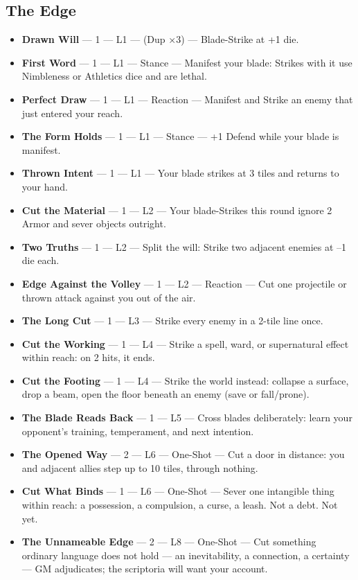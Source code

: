 \subsection{The Edge}
\begin{itemize}
    \item \textbf{Drawn Will} --- 1 --- L1 --- (Dup ×3) --- Blade-Strike at +1 die.
    \item \textbf{First Word} --- 1 --- L1 --- Stance --- Manifest your blade: Strikes with it use Nimbleness or Athletics dice and are lethal.
    \item \textbf{Perfect Draw} --- 1 --- L1 --- Reaction --- Manifest and Strike an enemy that just entered your reach.
    \item \textbf{The Form Holds} --- 1 --- L1 --- Stance --- +1 Defend while your blade is manifest.
    \item \textbf{Thrown Intent} --- 1 --- L1 --- Your blade strikes at 3 tiles and returns to your hand.
    \item \textbf{Cut the Material} --- 1 --- L2 --- Your blade-Strikes this round ignore 2 Armor and sever objects outright.
    \item \textbf{Two Truths} --- 1 --- L2 --- Split the will: Strike two adjacent enemies at --1 die each.
    \item \textbf{Edge Against the Volley} --- 1 --- L2 --- Reaction --- Cut one projectile or thrown attack against you out of the air.
    \item \textbf{The Long Cut} --- 1 --- L3 --- Strike every enemy in a 2-tile line once.
    \item \textbf{Cut the Working} --- 1 --- L4 --- Strike a spell, ward, or supernatural effect within reach: on 2 hits, it ends.
    \item \textbf{Cut the Footing} --- 1 --- L4 --- Strike the world instead: collapse a surface, drop a beam, open the floor beneath an enemy (save or fall/prone).
    \item \textbf{The Blade Reads Back} --- 1 --- L5 --- Cross blades deliberately: learn your opponent's training, temperament, and next intention.
    \item \textbf{The Opened Way} --- 2 --- L6 --- One-Shot --- Cut a door in distance: you and adjacent allies step up to 10 tiles, through nothing.
    \item \textbf{Cut What Binds} --- 1 --- L6 --- One-Shot --- Sever one intangible thing within reach: a possession, a compulsion, a curse, a leash. Not a debt. Not yet.
    \item \textbf{The Unnameable Edge} --- 2 --- L8 --- One-Shot --- Cut something ordinary language does not hold --- an inevitability, a connection, a certainty --- GM adjudicates; the scriptoria will want your account.
\end{itemize}

